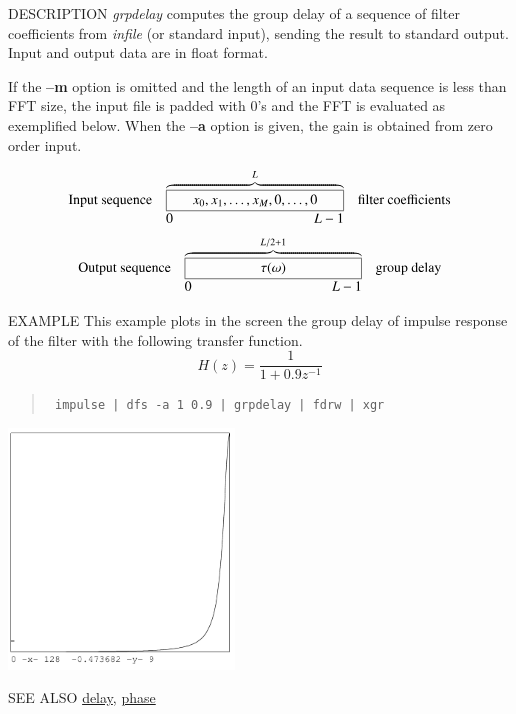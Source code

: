 \begin{qsection}{DESCRIPTION}
{\em grpdelay} computes the group delay of a sequence of filter coefficients 
from {\em infile} (or standard input), 
sending the result to standard output.
Input and output data are in float format.
\par
If the {\bf --m} option is omitted
and the length of an input data sequence is less than FFT size,
the input file is padded with 0's and the FFT is evaluated
as exemplified below.
When the {\bf --a} option is given,
the gain is obtained from zero order input.
\par
\[
\begin{array}{lll}
\mbox{Input sequence} & 
\overbrace{\framebox[4.5cm]{$x_0, x_1, \ldots, x_{M}, 0,
					\ldots,0$}}^{L}  & \mbox{filter coefficients}\\
		& \makebox[4.5cm]{0\hfill $L-1$} &
\end{array}
\]
\[
\begin{array}{lll}
\mbox{Output sequence} & \overbrace{\framebox[4.5cm]{$\tau(\omega)$}}^{L/2+1} &
	   \mbox{group delay}\\
		& \makebox[4.5cm]{0\hfill $L-1$} &

\end{array}
\]
\end{qsection}

\begin{options}
\end{options}


\begin{qsection}{EXAMPLE}
This example plots in the screen the group delay of impulse response
of the filter with the following transfer function.
\begin{displaymath}
  H(z)=\frac{1}{1+0.9z^{-1}}
\end{displaymath}
\begin{quote}
\verb! impulse | dfs -a 1 0.9 | grpdelay | fdrw | xgr !
\end{quote}  
\begin{center}
\includegraphics[width=6cm]{fig/grpdelay.pdf}
\end{center}
\end{qsection}

\begin{qsection}{SEE ALSO}
\hyperlink{delay}{delay},
\hyperlink{phase}{phase}
\end{qsection}
